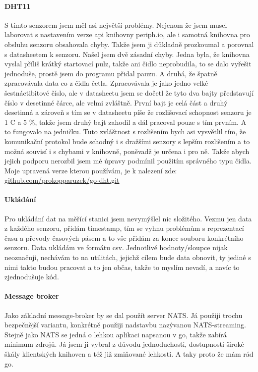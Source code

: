 \paragraph*{DHT11}
S tímto senzorem jsem měl asi největší problémy. Nejenom že jsem musel laborovat s nastavením verze api knihovny 
periph.io, ale i samotná knihovna pro obsluhu senzoru obsahovala chyby. Takže jsem ji důkladně prozkoumal a porovnal 
s datasheetem k senzoru. Našel jsem dvě zásadní chyby. Jedna byla, že knihovna vyslal příliš krátký startovací pulz, 
takže ani čidlo neprobudila, to se dalo vyřešit jednoduše, prostě jsem do programu přidal pauzu. A druhá, že špatně 
zpracovávala data co z čidla četla. Zpracovávala je jako jedno velké šestnáctibitové číslo, ale v datasheetu jsem se 
dočetl že tyto dva bajty představují číslo v desetinné čárce, ale velmi zvláštně. První bajt je celá část a druhý 
desetinná a zároveň s tím se v datasheetu píše že rozlišovací schopnost senzoru je 1 \textdegree C a 5 \%, takže jsem 
druhý bajt zahodil a dál pracoval pouze s tím prvním. A to fungovalo na jedničku. Tuto zvláštnost s rozlišením bych asi 
vysvětlil tím, že komunikační protokol bude schodný i s dražšími senzory s lepším rozlišením a to možná souvisí 
i s chybami v knihovně, poněvadž je určena i pro ně. Takže abych jejich podporu nerozbil jsem mé úpravy podmínil 
použitím správného typu čidla. Moje upravená verze kterou používám, je k nalezení zde: 
\href{https://github.com/prokopparuzek/go-dht.git}{github.com/prokopparuzek/go-dht.git}

\paragraph*{Ukládání}
Pro ukládání dat na měřící stanici jsem nevymýšlel nic složitého. Vezmu jen data z každého senzoru, přidám 
\gls{timestamp}, tím se vyhnu problémům s reprezentací času a převody časových pásem a to vše přidám za konec souboru 
konkrétního senzoru. Data ukládám ve formátu \acrshort{csv}. Jednotlivé hodnoty/sloupce nijak neoznačuji, nechávám to na 
utilitách, jejichž cílem bude data obnovit, ty jediné s nimi takto budou pracovat a to jen občas, takže to myslím 
nevadí, a navíc to zjednodušuje kód.

\paragraph*{Message broker}
Jako základní \gls{message-broker} by se dal použít server NATS. Já použiji trochu bezpečnější variantu, konkrétně 
použiji nadstavbu nazývanou NATS-streaming. Stejně jako NATS se jedná o lehkou aplikaci napsanou v go, takže zabírá 
minimum zdrojů. Já jsem ji vybral z důvodu jednoduchosti, dostupnosti široké škály klientských knihoven a též již 
zmiňované lehkosti. A taky proto že mám rád go.

